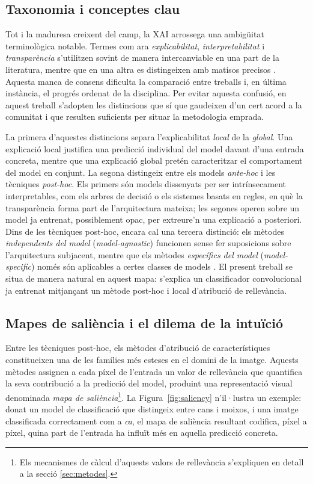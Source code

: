 \subsection{Taxonomia i conceptes clau}
Tot i la maduresa creixent del camp, la \ac{XAI} arrossega una ambigüitat terminològica notable. Termes com ara \emph{explicabilitat}, \emph{interpretabilitat} i \emph{transparència} s'utilitzen sovint de manera intercanviable en una part de la literatura, mentre que en una altra es distingeixen amb matisos precisos \cite{Longo2024}. Aquesta manca de consens dificulta la comparació entre treballs i, en última instància, el progrés ordenat de la disciplina. Per evitar aquesta confusió, en aquest treball s'adopten les distincions que sí que gaudeixen d'un cert acord a la comunitat i que resulten suficients per situar la metodologia emprada.

La primera d'aquestes distincions separa l'explicabilitat \emph{local} de la \emph{global}. Una explicació local justifica una predicció individual del model davant d'una entrada concreta, mentre que una explicació global pretén caracteritzar el comportament del model en conjunt. La segona distingeix entre els models \emph{ante-hoc} i les tècniques \emph{post-hoc}. Els primers són models dissenyats per ser intrínsecament interpretables, com els arbres de decisió o els sistemes basats en regles, en què la transparència forma part de l'arquitectura mateixa; les segones operen sobre un model ja entrenat, possiblement opac, per extreure'n una explicació a posteriori. Dins de les tècniques post-hoc, encara cal una tercera distinció: els mètodes \emph{independents del model} (\emph{model-agnostic}) funcionen sense fer suposicions sobre l'arquitectura subjacent, mentre que els mètodes \emph{específics del model} (\emph{model-specific}) només són aplicables a certes classes de models \cite{Longo2024}. El present treball se situa de manera natural en aquest mapa: s'explica un classificador convolucional ja entrenat mitjançant un mètode post-hoc i local d'atribució de rellevància.

\subsection{Mapes de saliència i el dilema de la intuïció}
Entre les tècniques post-hoc, els mètodes d'atribució de característiques constitueixen una de les famílies més esteses en el domini de la imatge. Aquests mètodes assignen a cada píxel de l'entrada un valor de rellevància que quantifica la seva contribució a la predicció del model, produint una representació visual denominada \emph{mapa de saliència}\footnote{Els mecanismes de càlcul d'aquests valors de rellevància s'expliquen en detall a la secció \ref{sec:metodes}.}. La Figura~\ref{fig:saliency} n'il·lustra un exemple: donat un model de classificació que distingeix entre cans i moixos, i una imatge classificada correctament com a \emph{ca}, el mapa de saliència resultant codifica, píxel a píxel, quina part de l'entrada ha influït més en aquella predicció concreta.

